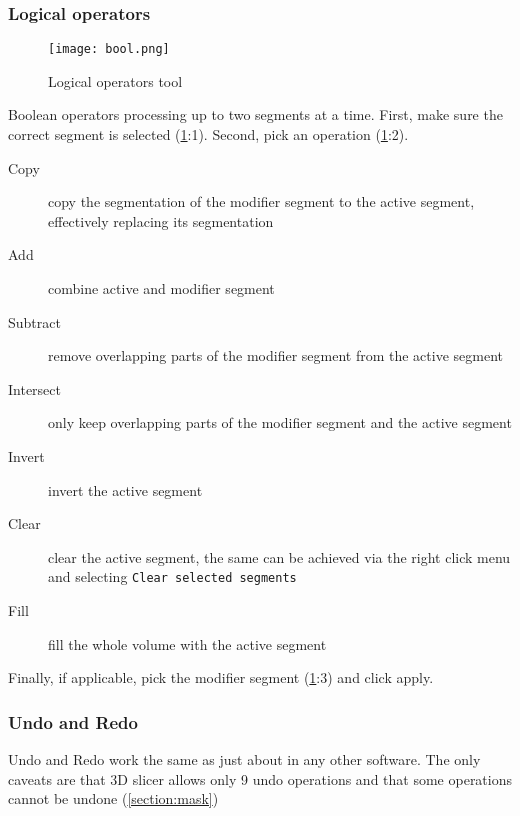 \subsubsection{Logical operators}
\begin{figure}[h!]
	\centerline{
		\texttt{[image: bool.png]}}
	\caption{Logical operators tool}\label{fig:bool}
\end{figure}
\noindent
Boolean operators processing up to two segments at a time.
First, make sure the correct segment is selected (\cref{fig:bool}:1).
Second, pick an operation (\cref{fig:bool}:2).
\begin{description}
	\item [Copy] copy the segmentation of the modifier segment to the active segment, effectively replacing its segmentation
	\item [Add] combine active and modifier segment
	\item [Subtract] remove overlapping parts of the modifier segment from the active segment
	\item [Intersect] only keep overlapping parts of the modifier segment and the active segment
	\item [Invert] invert the active segment
	\item [Clear] clear the active segment, the same can be achieved via the right click menu and selecting \texttt{Clear selected segments}
	\item [Fill] fill the whole volume with the active segment
\end{description}
Finally, if applicable, pick the modifier segment (\cref{fig:bool}:3) and click apply.

\subsubsection{Undo and Redo}
Undo and Redo work the same as just about in any other software.
The only caveats are that 3D slicer allows only 9 undo operations and that some operations cannot be undone (\cref{section:mask})
\pagebreak

